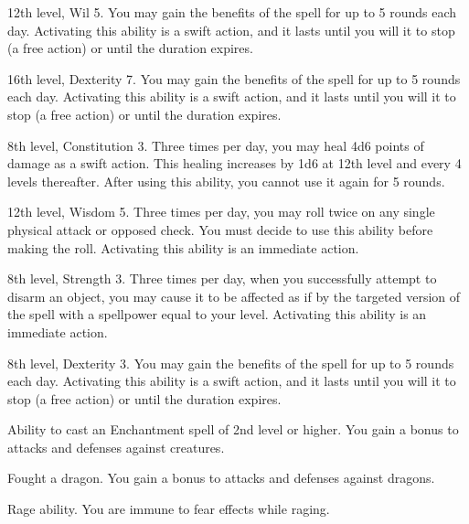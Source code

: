 \featpres 12th level, Wil 5.
\featben You may gain the benefits of the 
spell for up to 5 rounds each day.
Activating this ability is a swift action, and it lasts until you will it to stop (a free action) or until the duration expires.

\featpres 16th level, Dexterity 7.
\featben You may gain the benefits of the 
spell for up to 5 rounds each day.
Activating this ability is a swift action, and it lasts until you will it to stop (a free action) or until the duration expires.

\featpres 8th level, Constitution 3.
\featben Three times per day, you may heal 4d6 points of damage as a swift action.
This healing increases by 1d6 at 12th level and every 4 levels thereafter.
After using this ability, you cannot use it again for 5 rounds.

\featpres 12th level, Wisdom 5.
\featben Three times per day, you may roll twice on any single physical attack or opposed check.
You must decide to use this ability before making the roll.
Activating this ability is an immediate action.

\featpres 8th level, Strength 3.
\featben Three times per day, when you successfully attempt to disarm an object, you may cause it to be affected as if by the targeted version of the  spell with a spellpower equal to your level.
Activating this ability is an immediate action.

\featpres 8th level, Dexterity 3.
\featben You may gain the benefits of the 
spell for up to 5 rounds each day.
Activating this ability is a swift action, and it lasts until you will it to stop (a free action) or until the duration expires.


\featpre Ability to cast an Enchantment spell of 2nd level or higher.
\featben You gain a  bonus to attacks and defenses against \disoriented creatures.
\featspecial \featbanenotes

\featpre Fought a dragon.
\featben You gain a  bonus to attacks and defenses against dragons.
\featspecial \featbanenotes

\featpre Rage ability.
\featben You are immune to fear effects while raging.


